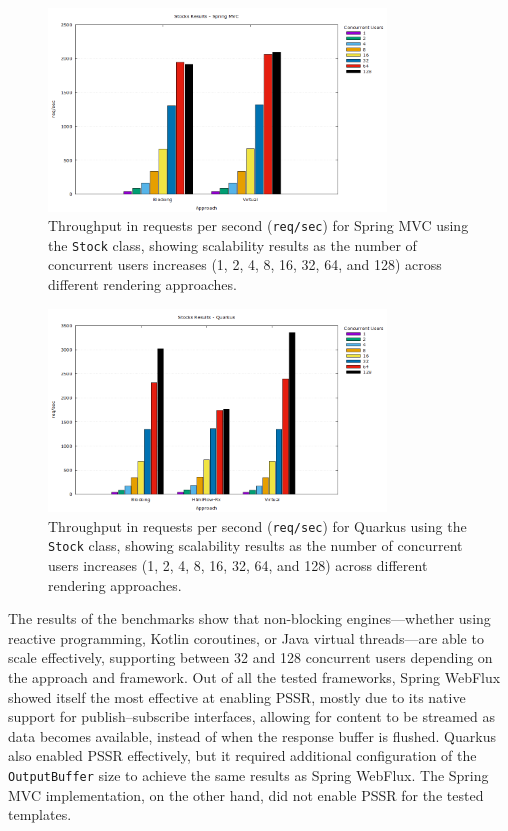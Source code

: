 \documentclass[software,article,accept,pdftex,moreauthors]{Definitions/mdpi}
\begin{document}
\begin{figure}[H]
\vspace{-3pt}
     \includegraphics[width=0.8\textwidth]{./Graphs/stocks-springmvc-jmeter.png}
     \caption{Throughput in requests per second (\texttt{req/sec}) for Spring
MVC using the \texttt{Stock} class, showing scalability results as
the number of concurrent users increases (1, 2, 4, 8, 16, 32, 64, and 128)
across different rendering approaches.}\label{fig:stocks-springmvc-jmeter}
\end{figure}
\vspace{-6pt}
\begin{figure}[H]

     \includegraphics[width=0.8\textwidth]{./Graphs/stocks-quarkus-jmeter.png}
     \caption{Throughput in requests per second (\texttt{req/sec}) for Quarkus
      using the \texttt{Stock} class, showing scalability results as the
      number of concurrent users increases (1, 2, 4, 8, 16, 32, 64, and 128)
      across different rendering approaches.}
\label{fig:stocks-quarkus-jmeter}
\end{figure}



The results of the benchmarks show that non-blocking engines---whether using
reactive programming, Kotlin coroutines, or Java virtual threads---are able to
scale effectively, supporting between 32 and 128 concurrent users depending on
the approach and framework. Out of all the tested frameworks, Spring WebFlux
showed itself the most effective at enabling PSSR, mostly due to its native
support for publish--subscribe interfaces, allowing for content to be streamed
as data becomes available, instead of when the response buffer is flushed.
Quarkus also enabled PSSR effectively, but it required additional configuration
of the \texttt{OutputBuffer} size to achieve the same results as Spring
WebFlux. The Spring MVC implementation, on the other hand, did not enable PSSR
for the tested templates.
\end{document}
